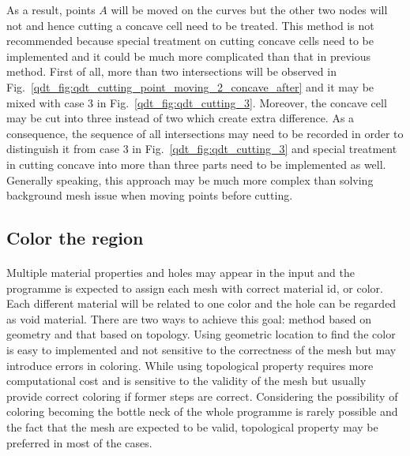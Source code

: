 As a result, points $A$ will be moved on the curves but the other two nodes will not and hence cutting a concave cell need to be treated.
This method is not recommended because special treatment on cutting concave cells need to be implemented and it could be much more complicated than that in previous method.
First of all, more than two intersections will be observed in Fig.~\ref{qdt_fig:qdt_cutting_point_moving_2_concave_after} and it may be mixed with case 3 in Fig.~\ref{qdt_fig:qdt_cutting_3}.
Moreover, the concave cell may be cut into three instead of two which create extra difference.
As a consequence, the sequence of all intersections may need to be recorded in order to distinguish it from case 3 in Fig.~\ref{qdt_fig:qdt_cutting_3} and special treatment in cutting concave into more than three parts need to be implemented as well.
Generally speaking, this approach may be much more complex than solving background mesh issue when moving points before cutting.


\subsection{Color the region}
\paragraph{}
Multiple material properties and holes may appear in the input and the programme is expected to assign each mesh with correct material id, or color.
Each different material will be related to one color and the hole can be regarded as void material.
There are two ways to achieve this goal: method based on geometry and that based on topology.
Using geometric location to find the color is easy to implemented and not sensitive to the correctness of the mesh but may introduce errors in coloring.
While using topological property requires more computational cost and is sensitive to the validity of the mesh but usually provide correct coloring if former steps are correct.
Considering the possibility of coloring becoming the bottle neck of the whole programme is rarely possible and the fact that the mesh are expected to be valid, topological property may be preferred in most of the cases.

